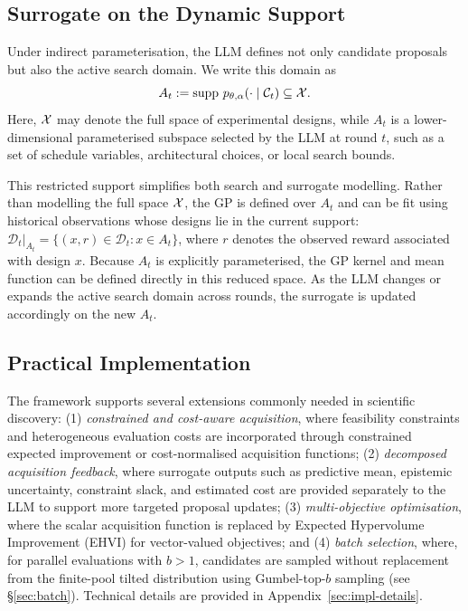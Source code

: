 \subsection{Surrogate on the Dynamic Support}
\label{sec:dynamic-support}

Under indirect parameterisation, the LLM defines not only candidate proposals but also the active search domain. We write this domain as
\[
A_t := \operatorname{supp}\, p_{\theta,\alpha}(\cdot\mid\mathcal{C}_t)\subseteq\mathcal{X}.
\]
Here, $\mathcal{X}$ may denote the full space of experimental designs, while $A_t$ is a lower-dimensional parameterised subspace selected by the LLM at round $t$, such as a set of schedule variables, architectural choices, or local search bounds.


This restricted support simplifies both search and surrogate modelling. Rather than modelling the full space $\mathcal{X}$, the GP is defined over $A_t$ and can be fit using historical observations whose designs lie in the current support:
$\mathcal D_t|_{A_t}=
\{(x,r)\in\mathcal D_t : x\in A_t\}$,
where $r$ denotes the observed reward associated with design $x$. Because $A_t$ is explicitly parameterised, the GP kernel and mean function can be defined directly in this reduced space. As the LLM changes or expands the active search domain across rounds, the surrogate is updated accordingly on the new $A_t$.

\subsection{Practical Implementation}


The framework supports several extensions commonly needed in scientific discovery: (1) \emph{constrained and cost-aware acquisition}, where feasibility constraints and heterogeneous evaluation costs are incorporated through constrained expected improvement or cost-normalised acquisition functions; (2) \emph{decomposed acquisition feedback}, where surrogate outputs such as predictive mean, epistemic uncertainty, constraint slack, and estimated cost are provided separately to the LLM to support more targeted proposal updates; (3) \emph{multi-objective optimisation}, where the scalar acquisition function is replaced by Expected Hypervolume Improvement (EHVI) for vector-valued objectives; and (4) \emph{batch selection}, where, for parallel evaluations with $b>1$, candidates are sampled without replacement from the finite-pool tilted distribution using Gumbel-top-$b$ sampling (see \S\ref{sec:batch}). Technical details are provided in Appendix~\ref{sec:impl-details}.